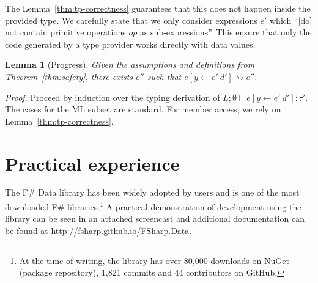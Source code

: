 \documentclass[10pt,preprint,clearpagebib]{sigplanconf}
\newcommand{\reduce}{\rightsquigarrow}
\newtheorem{lemma}[theorem]{Lemma}
\begin{document}
The Lemma~\ref{thm:tp-correctness} guarantees that this does not happen inside the provided type.
We carefully state that we only consider expressions $e'$ which 
``[do] not contain primitive operations $op$ as sub-expressions''. This ensure that only
the code generated by a type provider works directly with data values.

\begin{lemma}[Progress]
\label{thm:rs-progress}
Given the assumptions and definitions from Theorem~\ref{thm:safety}, there exists $e''$ such that
$e[y\leftarrow e'~d'] \reduce e''$.
\end{lemma}
\begin{proof}
Proceed by induction over the typing derivation of $L; \emptyset \vdash e[y\leftarrow e'~d'] : \tau'$. 
The cases for the ML subset are standard. For member access, we rely on Lemma~\ref{thm:tp-correctness}.
\end{proof}



%
%

\section{Practical experience}
\label{sec:impl}

The F\# Data library has been widely adopted by users and is one of the most downloaded
F\# libraries.\footnote{At the time of writing, the library has over 80,000 downloads on NuGet 
(package repository), 1,821 commits and 44 contributors on GitHub.} A practical demonstration of 
development using the library can be seen in an attached screencast and additional documentation can be
found at \url{http://fsharp.github.io/FSharp.Data}.
\end{document}
